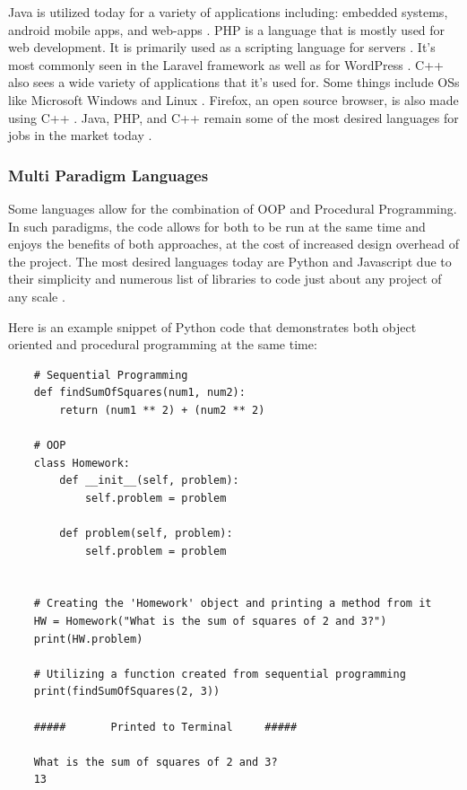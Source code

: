 Java is utilized today for a variety of applications including: embedded systems, android mobile apps, and web-apps \cite{JavaUse1, JavaUse2}.
PHP is a language that is mostly used for web development.
It is primarily used as a scripting language for servers \cite{PHPScriptingServer}.
It's most commonly seen in the Laravel framework as well as for WordPress \cite{PHPLaravel,PHPWP}.
C++ also sees a wide variety of applications that it's used for.
Some things include OSs like Microsoft Windows and Linux \cite{CPPUse1,CPPUse2}.
Firefox, an open source browser, is also made using C++ \cite{CPPFirefox,FirefoxMain}.
Java, PHP, and C++ remain some of the most desired languages for jobs in the market today \cite{TopLangs1,TopLangs2,TopLangs3}.

\subsubsection{Multi Paradigm Languages}\label{subsubsec:MultiParadigmPL}

Some languages allow for the combination of OOP and Procedural Programming.
In such paradigms, the code allows for both to be run at the same time and enjoys the benefits of both approaches, at the cost of increased design overhead of the project.
The most desired languages today are Python and Javascript due to their simplicity and numerous list of libraries to code just about any project of any scale \cite{TopLangs1,TopLangs2,TopLangs3,EasyLangs1,EasyLangs2,PyLibs,NPM,Yarn}.

Here is an example snippet of Python code that demonstrates both object oriented and procedural programming at the same time:

\begin{verbatim}
    # Sequential Programming
    def findSumOfSquares(num1, num2):
        return (num1 ** 2) + (num2 ** 2)

    # OOP
    class Homework:
        def __init__(self, problem):
            self.problem = problem
            
        def problem(self, problem):
            self.problem = problem


    # Creating the 'Homework' object and printing a method from it
    HW = Homework("What is the sum of squares of 2 and 3?")
    print(HW.problem)

    # Utilizing a function created from sequential programming
    print(findSumOfSquares(2, 3))

    #####       Printed to Terminal     #####

    What is the sum of squares of 2 and 3?
    13
\end{verbatim}

